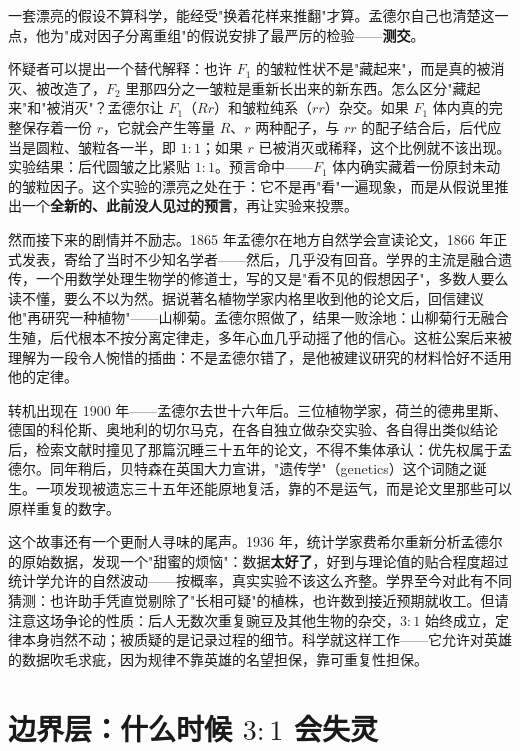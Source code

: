 \begin{zhengju}
一套漂亮的假设不算科学，能经受"换着花样来推翻"才算。孟德尔自己也清楚这一点，他为"成对因子分离重组"的假说安排了最严厉的检验——\textbf{测交}。

怀疑者可以提出一个替代解释：也许 $F_1$ 的皱粒性状不是"藏起来"，而是真的被消灭、被改造了，$F_2$ 里那四分之一皱粒是重新长出来的新东西。怎么区分"藏起来"和"被消灭"？孟德尔让 $F_1$（$Rr$）和皱粒纯系（$rr$）杂交。如果 $F_1$ 体内真的完整保存着一份 $r$，它就会产生等量 $R$、$r$ 两种配子，与 $rr$ 的配子结合后，后代应当是圆粒、皱粒各一半，即 $1:1$；如果 $r$ 已被消灭或稀释，这个比例就不该出现。实验结果：后代圆皱之比紧贴 $1:1$。预言命中——$F_1$ 体内确实藏着一份原封未动的皱粒因子。这个实验的漂亮之处在于：它不是再"看"一遍现象，而是从假说里推出一个\textbf{全新的、此前没人见过的预言}，再让实验来投票。

然而接下来的剧情并不励志。1865 年孟德尔在地方自然学会宣读论文，1866 年正式发表，寄给了当时不少知名学者——然后，几乎没有回音。学界的主流是融合遗传，一个用数学处理生物学的修道士，写的又是"看不见的假想因子"，多数人要么读不懂，要么不以为然。据说著名植物学家内格里收到他的论文后，回信建议他"再研究一种植物"——山柳菊。孟德尔照做了，结果一败涂地：山柳菊行无融合生殖，后代根本不按分离定律走，多年心血几乎动摇了他的信心。这桩公案后来被理解为一段令人惋惜的插曲：不是孟德尔错了，是他被建议研究的材料恰好不适用他的定律。

转机出现在 1900 年——孟德尔去世十六年后。三位植物学家，荷兰的德弗里斯、德国的科伦斯、奥地利的切尔马克，在各自独立做杂交实验、各自得出类似结论后，检索文献时撞见了那篇沉睡三十五年的论文，不得不集体承认：优先权属于孟德尔。同年稍后，贝特森在英国大力宣讲，"遗传学"（genetics）这个词随之诞生。一项发现被遗忘三十五年还能原地复活，靠的不是运气，而是论文里那些可以原样重复的数字。

这个故事还有一个更耐人寻味的尾声。1936 年，统计学家费希尔重新分析孟德尔的原始数据，发现一个"甜蜜的烦恼"：数据\textbf{太好了}，好到与理论值的贴合程度超过统计学允许的自然波动——按概率，真实实验不该这么齐整。学界至今对此有不同猜测：也许助手凭直觉剔除了"长相可疑"的植株，也许数到接近预期就收工。但请注意这场争论的性质：后人无数次重复豌豆及其他生物的杂交，$3:1$ 始终成立，定律本身岿然不动；被质疑的是记录过程的细节。科学就这样工作——它允许对英雄的数据吹毛求疵，因为规律不靠英雄的名望担保，靠可重复性担保。
\end{zhengju}

\section{边界层：什么时候 $3:1$ 会失灵}

